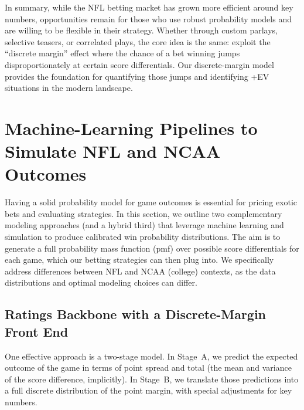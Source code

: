 \documentclass[12pt]{article}
\begin{document}
In summary, while the NFL betting market has grown more efficient around key numbers, opportunities remain for those who use robust probability models and are willing to be flexible in their strategy. Whether through custom parlays, selective teasers, or correlated plays, the core idea is the same: exploit the “discrete margin” effect where the chance of a bet winning jumps disproportionately at certain score differentials. Our discrete-margin model provides the foundation for quantifying those jumps and identifying +EV situations in the modern landscape.

\section{Machine-Learning Pipelines to Simulate NFL and NCAA Outcomes}
Having a solid probability model for game outcomes is essential for pricing exotic bets and evaluating strategies. In this section, we outline two complementary modeling approaches (and a hybrid third) that leverage machine learning and simulation to produce calibrated win probability distributions. The aim is to generate a full probability mass function (pmf) over possible score differentials for each game, which our betting strategies can then plug into. We specifically address differences between NFL and NCAA (college) contexts, as the data distributions and optimal modeling choices can differ.

\subsection{Ratings Backbone with a Discrete-Margin Front End}
One effective approach is a two-stage model. In Stage~A, we predict the expected outcome of the game in terms of point spread and total (the mean and variance of the score difference, implicitly). In Stage~B, we translate those predictions into a full discrete distribution of the point margin, with special adjustments for key numbers.
\end{document}
